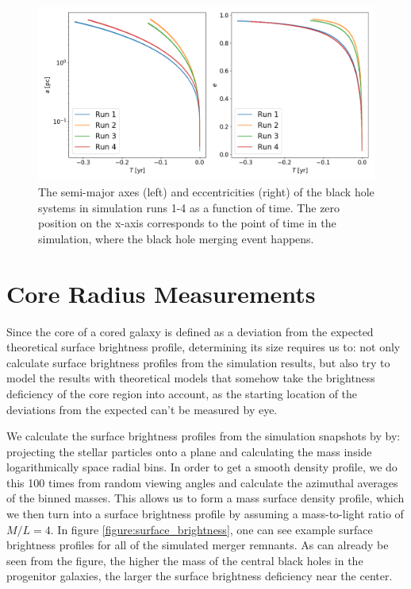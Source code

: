 \documentclass[english, oneside]{HYgradu}
\begin{document}
\begin{figure}[h]
	\centering
	\includegraphics[width=\textwidth]{semi_major_and_ecc.png}
	\caption{The semi-major axes (left) and eccentricities (right) of the black hole systems in simulation runs 1-4 as a function of time. The zero position on the x-axis corresponds to the point of time in the simulation, where the black hole merging event happens.}
\end{figure}

\section{Core Radius Measurements}

Since the core of a cored galaxy is defined as a deviation from the expected theoretical surface brightness profile, determining its size requires us to: not only calculate surface brightness profiles from the simulation results, but also try to model the results with theoretical models that somehow take the brightness deficiency of the core region into account, as the starting location of the deviations from the expected can't be measured by eye.

We calculate the surface brightness profiles from the simulation snapshots by \cite{Rantala2018} by: projecting the stellar particles onto a plane and calculating the mass inside logarithmically space radial bins. In order to get a smooth density profile, we do this 100 times from random viewing angles and calculate the azimuthal averages of the binned masses. This allows us to form a mass surface density profile, which we then turn into a surface brightness profile by assuming a mass-to-light ratio of $M/L = 4$. In figure \ref{figure:surface_brightness}, one can see example surface brightness profiles for all of the simulated merger remnants. As can already be seen from the figure, the higher the mass of the central black holes in the progenitor galaxies, the larger the surface brightness deficiency near the center.
\end{document}
